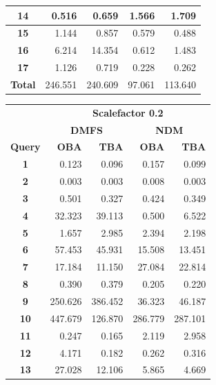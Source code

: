 \documentclass[a4paper]{article}
\begin{document}
{\begin{figure}[h]
\begin{minipage}{0.5\linewidth}
\begin{tiny}
\begin{tabular}{|c|r|r|r|r|}
        \hline
        \textbf{14}&0.516&0.659&1.566&1.709\\
        \hline
        \textbf{15}&1.144&0.857&0.579&0.488\\
        \hline
        \textbf{16}&6.214&14.354&0.612&1.483\\
        \hline
        \textbf{17}&1.126&0.719&0.228&0.262\\
        \hline
        \textbf{Total}&246.551&240.609&97.061&113.640\\
        \hline
      \end{tabular}
    \end{tiny}
  \end{minipage} \hfill
  \begin{minipage}{0.5\linewidth}
    \begin{tiny}
      \begin{tabular}{|c|r|r|r|r|}
        \hline
        &\multicolumn{4}{c|}{\textbf{Scalefactor 0.2}}\\
        \cline{2-5}
        &\multicolumn{2}{c|}{\textbf{DMFS}}&\multicolumn{2}{c|}{\textbf{NDM}}\\
        \hline
        \textbf{Query}&\textbf{OBA}&\textbf{TBA}&\textbf{OBA}&\textbf{TBA}\\
        \hline
        \textbf{1}&0.123&0.096&0.157&0.099\\
        \hline
        \textbf{2}&0.003&0.003&0.008&0.003\\
        \hline
        \textbf{3}&0.501&0.327&0.424&0.349\\
        \hline
        \textbf{4}&32.323&39.113&0.500&6.522\\
        \hline
        \textbf{5}&1.657&2.985&2.394&2.198\\
        \hline
        \textbf{6}&57.453&45.931&15.508&13.451\\
        \hline
        \textbf{7}&17.184&11.150&27.084&22.814\\
        \hline
        \textbf{8}&0.390&0.379&0.205&0.220\\
        \hline
        \textbf{9}&250.626&386.452&36.323&46.187\\
        \hline
        \textbf{10}&447.679&126.870&286.779&287.101\\
        \hline
        \textbf{11}&0.247&0.165&2.119&2.958\\
        \hline
        \textbf{12}&4.171&0.182&0.262&0.316\\
        \hline
        \textbf{13}&27.028&12.106&5.865&4.669\\

\end{tabular}
\end{tiny}
\end{minipage}
\end{figure}}
\end{document}
